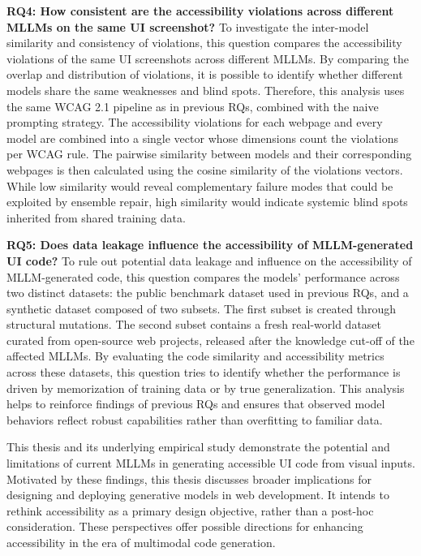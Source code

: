 \textbf{RQ4: How consistent are the accessibility violations across different MLLMs on the same UI screenshot?}
To investigate the inter-model similarity and consistency of violations, this question compares the 
accessibility violations of the same UI screenshots 
across different MLLMs. By comparing the overlap and 
distribution of violations, it is possible to identify 
whether different models share the same weaknesses and
blind spots. Therefore, this analysis uses the same WCAG 
2.1 pipeline as in previous RQs, combined with the naive prompting 
strategy. The accessibility violations for each webpage 
and every model are combined into a single vector whose 
dimensions count the violations per WCAG rule. The pairwise similarity 
between models and their corresponding webpages is then calculated 
using the cosine similarity of the violations vectors. While 
low similarity would reveal 
complementary failure modes that could be exploited by ensemble 
repair, high similarity would indicate systemic blind spots 
inherited from shared training data.\newline




\textbf{RQ5: Does data leakage influence the accessibility of MLLM-generated UI code?}
To rule out potential data leakage and influence on the accessibility 
of MLLM-generated code, this question compares the models' performance across
two distinct datasets: the public benchmark dataset used in previous 
RQs, and a synthetic dataset composed of two subsets. The first 
subset is created through structural mutations. The second subset contains
a fresh real-world dataset curated from open-source web projects, 
released after the knowledge cut-off of the affected MLLMs. By 
evaluating the code similarity and accessibility metrics across
these datasets, this question tries to identify whether the
performance is driven by memorization of training data or by
true generalization. This analysis helps to reinforce findings
of previous RQs and ensures that observed model behaviors reflect
robust capabilities rather than overfitting to familiar data.\newline

\noindent
This thesis and its underlying empirical study demonstrate the potential and 
limitations of current MLLMs in generating accessible UI code 
from visual inputs. 
Motivated by these findings, this thesis discusses broader implications
for designing and deploying generative models in web development. It 
intends to rethink accessibility as a primary design objective, rather than a 
post-hoc consideration. These perspectives offer possible directions for 
enhancing accessibility in the era of multimodal code generation.


